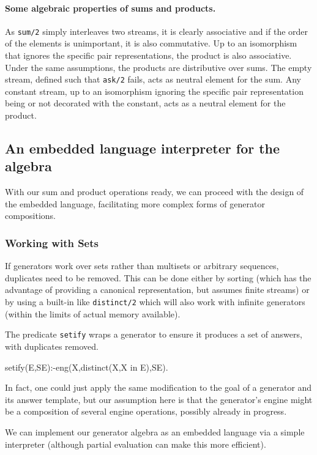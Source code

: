 \documentclass{new_tlp}
\begin{document}
\paragraph{Some algebraic properties of sums and products.}
As {\tt sum/2} simply interleaves two streams, it is clearly associative and
if  the order of the elements is unimportant, it is also commutative. 
Up to an isomorphism that ignores the specific pair representations, the product is also associative. Under the same assumptions, the products are distributive over sums.
The empty stream, defined such that {\tt ask/2}  fails, acts as neutral element for the sum. Any constant stream, up to an isomorphism ignoring the specific pair representation
being or not decorated with the constant, acts as a neutral element for the product.

\subsection{An embedded language interpreter for the algebra}

With our sum and product operations ready, we can proceed with the design of the embedded language, facilitating more complex forms of generator compositions.

\subsubsection{Working with Sets}

If generators work over sets rather than multisets or arbitrary sequences,
duplicates need to be removed. This can be done either by sorting (which has the advantage
of providing a canonical representation, but assumes finite streams) or by using  a built-in like {\tt distinct/2} which will also work with infinite generators (within the limits of actual memory available).

The predicate {\tt setify} wraps a generator to ensure it produces a set of answers, with duplicates removed.
\begin{code}
setify(E,SE):-eng(X,distinct(X,X in E),SE).
\end{code}
In fact, one could just apply the same modification to the goal of a generator and its answer template, but our assumption here is that the generator's engine might be a composition of several engine operations, possibly already in progress.

We can implement our generator algebra as an embedded language via a simple interpreter
(although partial evaluation can make this more efficient). 
\end{document}
